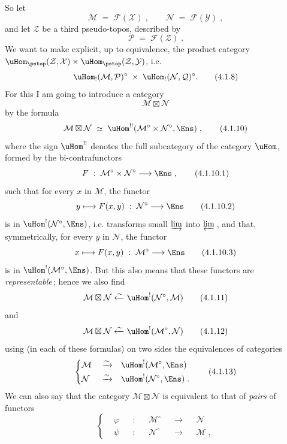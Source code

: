 So let
\[
\mathcal{M} \;=\; \mathcal{F}(\mathcal{X})\;, \qquad \mathcal{N} \;=\; \mathcal{F}(\mathcal{Y})\;,
\tag*{(4.1.6)}
\]
and let $\mathcal{Z}$ be a third pseudo-topos, described by
\[
\mathcal{P} \;=\; \mathcal{F}(\mathcal{Z})\;.
\tag*{(4.1.7)}
\]
We want to make explicit, up to equivalence, the product category $\uHom_{\pstop}(\mathcal{Z},\mathcal{X})\times\uHom_{\pstop}(\mathcal{Z},\mathcal{Y})$, i.e.
\[
\uHom_!(\mathcal{M},\mathcal{P})^\circ \;\times\; \uHom_!(\mathcal{N},\mathcal{Q})^\circ.
\tag*{(4.1.8)}
\] %
For this I am going to introduce a category
\[
\mathcal{M}\boxtimes\mathcal{N}
\tag*{(4.1.9)}
\]
by the formula
\[
\mathcal{M}\boxtimes\mathcal{N} \;\simeq\; \uHom^{!!}(\mathcal{M}^\circ\times\mathcal{N}^\circ,\Ens)\;,
\tag*{(4.1.10)}
\]
where the sign $\uHom^{!!}$ denotes the full subcategory of the category $\uHom$, formed by the bi-contrafunctors %
\[
F \;:\; \mathcal{M}^\circ\times\mathcal{N}^\circ \longrightarrow \Ens\;,
\tag*{(4.1.10.1)}
\]
such that for every $x$ in $\mathcal{M}$, the functor
\[
y \longmapsto F(x,y) \;:\; \mathcal{N}^\circ \longrightarrow \Ens
\tag*{(4.1.10.2)}
\]
is in $\uHom^!(\mathcal{N}^\circ,\Ens)$, i.e. transforms small $\varinjlim$ into $\varprojlim$\,, and that, symmetrically, for every $y$ in $\mathcal{N}$, the functor
\[
x \longmapsto F(x,y) \;:\; \mathcal{M}^\circ \longrightarrow \Ens
\tag*{(4.1.10.3)}
\]
is in $\uHom^!(\mathcal{M}^\circ,\Ens)$. But this also means that these functors are \textit{representable}\,; hence we also find
\[
\mathcal{M}\boxtimes\mathcal{N} \xleftarrow{\sim} \uHom^!(\mathcal{N}^\circ,\mathcal{M})
\tag*{(4.1.11)}
\]
and
\[
\mathcal{M}\boxtimes\mathcal{N} \xleftarrow{\sim} \uHom^!(\mathcal{M}^\circ,\mathcal{N})
\tag*{(4.1.12)}
\]
using (in each of these formulas) on two sides the equivalences of categories
\[
\left\{
\begin{aligned}
&\mathcal{M} &&\xrightarrow{\sim} &&\uHom^!(\mathcal{M}^\circ,\Ens)\\
&\mathcal{N} &&\xrightarrow{\sim} &&\uHom^!(\mathcal{N}^\circ,\Ens)\;.
\end{aligned}
\right.
\tag*{(4.1.13)}
\]
We can also say that the category $\mathcal{M}\boxtimes\mathcal{N}$ is equivalent to that of \textit{pairs} of functors
\[
\left\{
\begin{aligned}
&\varphi &&: &&\mathcal{M}^\circ &&\longrightarrow &&\mathcal{N}\\
&\psi &&: &&\mathcal{N}^\circ &&\longrightarrow &&\mathcal{M}\;,
\end{aligned}
\right.
\tag*{(4.1.14)}
\]
